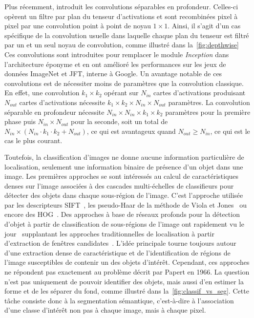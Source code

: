 Plus récemment, \cite{chollet_xception_2017} introduit les convolutions séparables en profondeur. Celles-ci opèrent un filtre par plan du tenseur d'activations et sont recombinées pixel à pixel par une convolution point à point de noyau $1\times1$. Ainsi, il s'agit d'un cas spécifique de la convolution usuelle dans laquelle chaque plan du tenseur est filtré par un et un seul noyau de convolution, comme illustré dans la~\cref{fig:depthwise} Ces convolutions sont introduites pour remplacer le module \emph{Inception} dans l'architecture éponyme et en ont amélioré les performances sur les jeux de données ImageNet et JFT, interne à Google. Un avantage notable de ces convolutions est de nécessiter moins de paramètres que la convolution classique. En effet, une convolution $k_1 \times k_2$ opérant sur $N_{in}$ cartes d'activations produisant $N_{out}$ cartes d'activations nécessite $k_1 \times k_2 \times N_{in} \times N_{out}$ paramètres. La convolution séparable en profondeur nécessite $N_{in} \times N_{in} \times k_1 \times k_2$ paramètres pour la première phase puis $N_{in} \times N_{out}$ pour la seconde, soit un total de $N_{in} \times (N_{in} \cdot k_1 \cdot k_2 + N_{out})$, ce qui est avantageux quand $N_{out} \ge N_{in}$, ce qui est le cas le plus courant.

Toutefois, la classification d'images ne donne aucune information particulière de localisation, seulement une information binaire de présence d'un objet dans une image. Les premières approches se sont intéressés au calcul de caractéristiques denses sur l'image associées à des cascades multi-échelles de classifieurs pour détecter des objets dans chaque sous-région de l'image. C'est l'approche utilisée par les descripteurs \gls{SIFT}~\cite{lowe_object_1999}, les pseudo-Haar de la méthode de Viola et Jones~\cite{viola_robust_2001} ou encore des \gls{HOG}~\cite{dalal_histograms_2005}. Des approches à base de réseaux profonds pour la détection d'objet à partir de classification de sous-régions de l'image ont rapidement vu le jour~\cite{girshick_rich_2014,liu_ssd_2016,girshick_region-based_2016} supplantant les approches traditionnelles de localisation à partir d'extraction de fenêtres candidates~\cite{gu_recognition_2009,uijlings_selective_2013}. L'idée principale tourne toujours autour d'une extraction dense de caractéristique et de l'identification de régions de l'image susceptibles de contenir un des objets d'intérêt. Cependant, ces approches ne répondent pas exactement au problème décrit par Papert en 1966. La question n'est pas uniquement de pouvoir identifier des objets, mais aussi d'en estimer la forme et de les séparer du fond, comme illustré dans la~\cref{fig:classif_vs_seg}. Cette tâche consiste donc à la segmentation sémantique, c'est-à-dire à l'association d'une classe d'intérêt non pas à chaque image, mais à chaque pixel.

